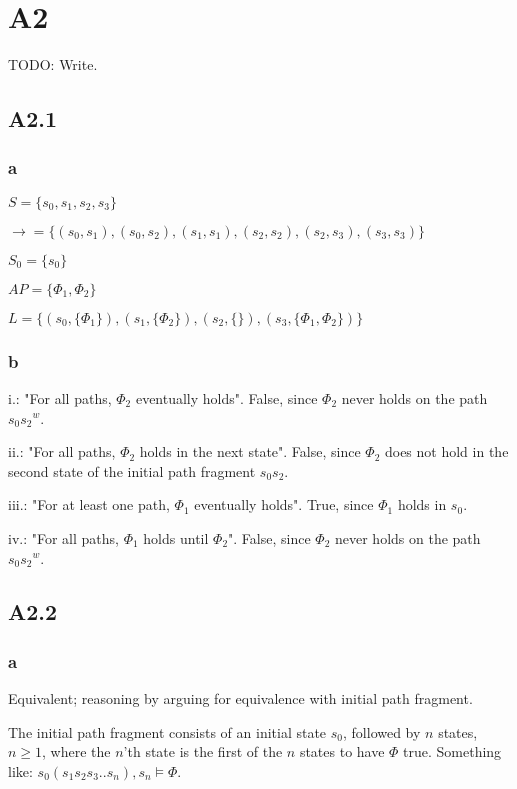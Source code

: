
\section{A2}

TODO: Write.

\subsection{A2.1}

\subsubsection{a}

$S = \{s_0, s_1, s_2, s_3\}$

$\rightarrow = \{
  (s_0, s_1), (s_0, s_2),
  (s_1, s_1),
  (s_2, s_2), (s_2, s_3),
  (s_3, s_3)
\}$

$S_0 = \{s_0\}$

$AP = \{\Phi_1, \Phi_2\}$

$L = \{
  (s_0, \{\Phi_1\}),
  (s_1, \{\Phi_2\}),
  (s_2, \{\}),
  (s_3, \{\Phi_1, \Phi_2\})
\}$

\subsubsection{b}

i.: "For all paths, $\Phi_2$ eventually holds". False, since $\Phi_2$ never holds on the path $s_0{s_2}^w$.

ii.: "For all paths, $\Phi_2$ holds in the next state". False, since $\Phi_2$ does not hold
     in the second state of the initial path fragment $s_0s_2$.

iii.: "For at least one path, $\Phi_1$ eventually holds". True, since $\Phi_1$ holds in $s_0$.

iv.: "For all paths, $\Phi_1$ holds until $\Phi_2$". False, since $\Phi_2$ never holds on the path $s_0{s_2}^w$.

\subsection{A2.2}

\subsubsection{a}

Equivalent; reasoning by arguing for equivalence with initial path fragment.

The initial path fragment consists of an initial state $s_0$,
followed by $n$ states, $n \ge 1$, where the $n$'th state
is the first of the $n$ states to have $\Phi$ true.
Something like: $s_0 ( s_1 s_2 s_3 .. s_n ), s_n \models \Phi$.

